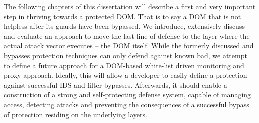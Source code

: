   The following chapters of this dissertation will describe a first and very important step in thriving towards a protected DOM. That is to say a DOM that is not helpless after its guards have been bypassed. We introduce, extensively discuss and evaluate an approach to move the last line of defense to the layer where the actual attack vector executes -- the DOM itself. While the formerly discussed and bypasses protection techniques can only defend against known bad, we attempt to define a future approach for a DOM-based white-list driven monitoring and proxy approach. Ideally, this will allow a developer to easily define a protection against successful IDS and filter bypasses. Afterwards, it should enable a construction of a strong and self-protecting defense system, capable of managing access, detecting attacks and preventing the consequences of a successful bypass of protection residing on the underlying layers.

\pagebreak